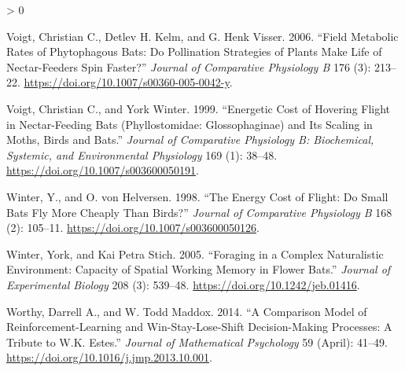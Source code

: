 \documentclass[
]{article}
\newlength{\cslhangindent}
\newenvironment{CSLReferences}[2] %
 {%
  \setlength{\parindent}{0pt}
  \ifodd #1 \everypar{\setlength{\hangindent}{\cslhangindent}}\ignorespaces\fi
  \ifnum #2 > 0
  \setlength{\parskip}{#2\baselineskip}
  \fi
 }%
 {}
\begin{document}
\begin{CSLReferences}{1}{0}
\leavevmode\hypertarget{ref-voigt_field_2006}{}%
Voigt, Christian C., Detlev H. Kelm, and G. Henk Visser. 2006. {``Field Metabolic Rates of Phytophagous Bats: Do Pollination Strategies of Plants Make Life of Nectar-Feeders Spin Faster?''} \emph{Journal of Comparative Physiology B} 176 (3): 213--22. \url{https://doi.org/10.1007/s00360-005-0042-y}.

\leavevmode\hypertarget{ref-voigt_energetic_1999}{}%
Voigt, Christian C., and York Winter. 1999. {``Energetic Cost of Hovering Flight in Nectar-Feeding Bats ({Phyllostomidae}: {Glossophaginae}) and Its Scaling in Moths, Birds and Bats.''} \emph{Journal of Comparative Physiology B: Biochemical, Systemic, and Environmental Physiology} 169 (1): 38--48. \url{https://doi.org/10.1007/s003600050191}.

\leavevmode\hypertarget{ref-winter_energy_1998}{}%
Winter, Y., and O. von Helversen. 1998. {``The Energy Cost of Flight: Do Small Bats Fly More Cheaply Than Birds?''} \emph{Journal of Comparative Physiology B} 168 (2): 105--11. \url{https://doi.org/10.1007/s003600050126}.

\leavevmode\hypertarget{ref-winter_foraging_2005}{}%
Winter, York, and Kai Petra Stich. 2005. {``Foraging in a Complex Naturalistic Environment: Capacity of Spatial Working Memory in Flower Bats.''} \emph{Journal of Experimental Biology} 208 (3): 539--48. \url{https://doi.org/10.1242/jeb.01416}.

\leavevmode\hypertarget{ref-worthy_comparison_2014}{}%
Worthy, Darrell A., and W. Todd Maddox. 2014. {``A {Comparison} {Model} of {Reinforcement}-{Learning} and {Win}-{Stay}-{Lose}-{Shift} {Decision}-{Making} {Processes}: {A} {Tribute} to {W}.{K}. {Estes}.''} \emph{Journal of Mathematical Psychology} 59 (April): 41--49. \url{https://doi.org/10.1016/j.jmp.2013.10.001}.

\end{CSLReferences}
\end{document}
